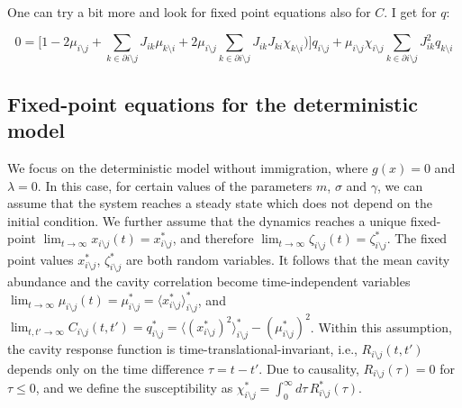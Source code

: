 \documentclass[
    preprint,
    linenumbers,
    amsmath,amssymb,amsfonts,
    aps, physrev,
    superscriptaddress,
    10pt,
    bibnotes
    ]{revtex4-2}
\begin{document}
One can try a bit more and look for fixed point equations also for $C$. I get for $q$:

\begin{equation}
  0 = \Big[ 1 - 2 \mu_{i\setminus j} + \sum_{k\in \partial i \setminus j} J_{ik} \mu_{k\setminus i} + 2\mu_{i\setminus j}  \sum_{k\in \partial i \setminus j} J_{ik}J_{ki} \chi_{k\setminus i} ) \Big] q_{i\setminus j}+ \mu_{i \setminus j} \chi_{i \setminus j}\sum_{k\in \partial i \setminus j} J_{ik}^2 q_{k \setminus i}
\end{equation}

\subsection{Fixed-point equations for the deterministic model}

We focus on the deterministic model without immigration, where $g(x)=0$ and $\lambda=0$. In this case, for certain values of the parameters $m$, $\sigma$ and $\gamma$, we can assume that the system reaches a steady state which does not depend on the initial condition. We further assume that the dynamics reaches a unique fixed-point $\lim_{t\to\infty}x_{i\setminus j}(t)=x_{i\setminus j}^{*}$, and therefore $\lim_{t\to\infty}\zeta_{i\setminus j}(t)=\zeta_{i\setminus j}^{*}$. The fixed point values $x_{i\setminus j}^{*}$, $\zeta_{i\setminus j}^{*}$ are both random variables. It follows that the mean cavity abundance and the cavity correlation become time-independent variables $\lim_{t\to\infty}\mu_{i\setminus j}(t)=\mu_{i\setminus j}^{*}=\langle x_{i\setminus j}^{*}\rangle_{i\setminus j}^{*}$, and $\lim_{t,t'\to\infty}C_{i\setminus j}(t,t')=q_{i\setminus j}^{*}=\langle ( x_{i\setminus j}^{*})^2\rangle_{i\setminus j}^{*} - (\mu_{i\setminus j}^{*})^2$. Within this assumption, the cavity response function is time-translational-invariant, i.e., $R_{i\setminus j}(t,t')$ depends only on the time difference $\tau=t-t'$. Due to causality, $R_{i\setminus j}(\tau)=0$ for $\tau\leq 0$, and we define the susceptibility as $\chi_{i\setminus j}^{*}=\int_{0}^{\infty}d\tau\,R_{i\setminus j}^{*}(\tau)$. 
\end{document}
